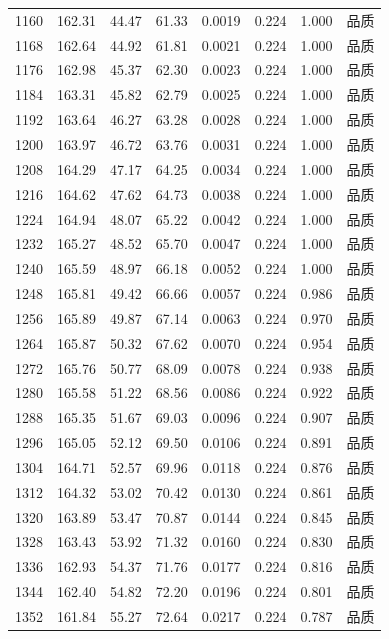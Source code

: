 \begin{longtable}{rrrrrrrr}
1160 & 162.31 & 44.47 & 61.33 & 0.0019 & 0.224 & 1.000 & 品质 \\
1168 & 162.64 & 44.92 & 61.81 & 0.0021 & 0.224 & 1.000 & 品质 \\
1176 & 162.98 & 45.37 & 62.30 & 0.0023 & 0.224 & 1.000 & 品质 \\
1184 & 163.31 & 45.82 & 62.79 & 0.0025 & 0.224 & 1.000 & 品质 \\
1192 & 163.64 & 46.27 & 63.28 & 0.0028 & 0.224 & 1.000 & 品质 \\
1200 & 163.97 & 46.72 & 63.76 & 0.0031 & 0.224 & 1.000 & 品质 \\
1208 & 164.29 & 47.17 & 64.25 & 0.0034 & 0.224 & 1.000 & 品质 \\
1216 & 164.62 & 47.62 & 64.73 & 0.0038 & 0.224 & 1.000 & 品质 \\
1224 & 164.94 & 48.07 & 65.22 & 0.0042 & 0.224 & 1.000 & 品质 \\
1232 & 165.27 & 48.52 & 65.70 & 0.0047 & 0.224 & 1.000 & 品质 \\
1240 & 165.59 & 48.97 & 66.18 & 0.0052 & 0.224 & 1.000 & 品质 \\
1248 & 165.81 & 49.42 & 66.66 & 0.0057 & 0.224 & 0.986 & 品质 \\
1256 & 165.89 & 49.87 & 67.14 & 0.0063 & 0.224 & 0.970 & 品质 \\
1264 & 165.87 & 50.32 & 67.62 & 0.0070 & 0.224 & 0.954 & 品质 \\
1272 & 165.76 & 50.77 & 68.09 & 0.0078 & 0.224 & 0.938 & 品质 \\
1280 & 165.58 & 51.22 & 68.56 & 0.0086 & 0.224 & 0.922 & 品质 \\
1288 & 165.35 & 51.67 & 69.03 & 0.0096 & 0.224 & 0.907 & 品质 \\
1296 & 165.05 & 52.12 & 69.50 & 0.0106 & 0.224 & 0.891 & 品质 \\
1304 & 164.71 & 52.57 & 69.96 & 0.0118 & 0.224 & 0.876 & 品质 \\
1312 & 164.32 & 53.02 & 70.42 & 0.0130 & 0.224 & 0.861 & 品质 \\
1320 & 163.89 & 53.47 & 70.87 & 0.0144 & 0.224 & 0.845 & 品质 \\
1328 & 163.43 & 53.92 & 71.32 & 0.0160 & 0.224 & 0.830 & 品质 \\
1336 & 162.93 & 54.37 & 71.76 & 0.0177 & 0.224 & 0.816 & 品质 \\
1344 & 162.40 & 54.82 & 72.20 & 0.0196 & 0.224 & 0.801 & 品质 \\
1352 & 161.84 & 55.27 & 72.64 & 0.0217 & 0.224 & 0.787 & 品质 \\

\end{longtable}
